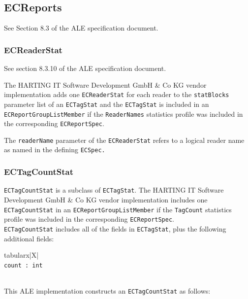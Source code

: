 \documentclass[11pt,a4paper,oneside]{article}
\newenvironment{bbox}%
{\begin{table}[h!]\begin{threeparttable}}%
{\end{threeparttable}\end{table}\FloatBarrier}
\newenvironment{bbox}
{\ifvmode\IgnorePar\fi \EndP\Tg<div class='bbox'>}{\Tg</div>\IgnoreIndent}
\begin{document}
\subsection{ECReports}
See Section 8.3 of the ALE specification document.
\subsubsection{ECReaderStat}
See section 8.3.10 of the ALE specification document.

The HARTING IT Software Development GmbH \& Co KG vendor implementation adds one \texttt{ECReaderStat} for each reader to the \texttt{statBlocks} parameter list of an \texttt{ECTagStat} and the \texttt{ECTagStat} is included in an 
\ifpdf\\ \fi
\texttt{ECReportGroupListMember} if the \texttt{ReaderNames} statistics profile was included in the corresponding \texttt{ECReportSpec}.

The \texttt{readerName} parameter of the \texttt{ECReaderStat} refers to a logical reader name as named in the defining \texttt{ECSpec.}

\subsubsection{ECTagCountStat}
\texttt{ECTagCountStat} is a subclass of \texttt{ECTagStat}. The HARTING IT Software Development GmbH \& Co KG vendor implementation includes one \\\texttt{ECTagCountStat} in an \texttt{ECReportGroupListMember} if the \texttt{TagCount} statistics profile was included in the corresponding \texttt{ECReportSpec}.\\\texttt{ECTagCountStat} includes all of the fields in \texttt{ECTagStat}, plus the following additional fields:

\begin{bbox}
\begin{edtable}{tabularx}{\linewidth}{|X|}
\hline 
{}
\\
\texttt{count : int }\\
\texttt{\textendash \textendash \textendash}\\
\hline
\end{edtable}
\end{bbox}

This ALE implementation constructs an \texttt{ECTagCountStat} as follows:
\end{document}
